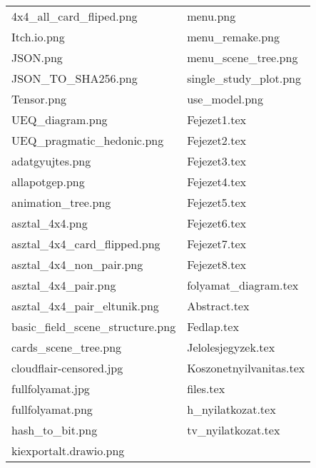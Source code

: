 \begin{tabular}{l l}
    \quad 4x4\_all\_card\_fliped.png & \quad\quad\quad menu.png\\
    \quad Itch.io.png & \quad\quad\quad menu\_remake.png\\
    \quad JSON.png & \quad\quad\quad menu\_scene\_tree.png\\
    \quad JSON\_TO\_SHA256.png & \quad\quad\quad single\_study\_plot.png\\
    \quad Tensor.png & \quad\quad\quad use\_model.png\\
    \quad UEQ\_diagram.png & \quad\quad\quad Fejezet1.tex\\
    \quad UEQ\_pragmatic\_hedonic.png & \quad\quad\quad Fejezet2.tex\\
    \quad adatgyujtes.png & \quad\quad\quad Fejezet3.tex\\
    \quad allapotgep.png & \quad\quad\quad Fejezet4.tex\\
    \quad animation\_tree.png & \quad\quad\quad Fejezet5.tex\\
    \quad asztal\_4x4.png & \quad\quad\quad Fejezet6.tex\\
    \quad asztal\_4x4\_card\_flipped.png & \quad\quad\quad Fejezet7.tex\\
    \quad asztal\_4x4\_non\_pair.png & \quad\quad\quad Fejezet8.tex\\
    \quad asztal\_4x4\_pair.png & \quad\quad\quad folyamat\_diagram.tex\\
    \quad asztal\_4x4\_pair\_eltunik.png & \quad\quad\quad Abstract.tex\\
    \quad basic\_field\_scene\_structure.png & \quad\quad\quad Fedlap.tex\\
    \quad cards\_scene\_tree.png & \quad\quad\quad Jelolesjegyzek.tex\\
    \quad cloudflair-censored.jpg & \quad\quad\quad Koszonetnyilvanitas.tex\\
    \quad fullfolyamat.jpg & \quad\quad\quad files.tex\\
    \quad fullfolyamat.png & \quad\quad\quad h\_nyilatkozat.tex\\
    \quad hash\_to\_bit.png & \quad\quad\quad tv\_nyilatkozat.tex\\
    \quad kiexportalt.drawio.png & \quad\quad\quad\\
\end{tabular}
\vspace{28pt}

